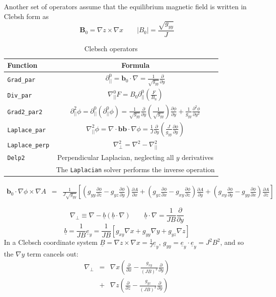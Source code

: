\documentclass[12pt]{article}
\newcommand{\code}[1]{\texttt{#1}}
\newcommand{\deriv}[2]{\ensuremath{\frac{\partial #1}{\partial #2}}}
\begin{document}
Another set of operators assume that the equilibrium magnetic field is written
in Clebsh form as 
\[
\mathbf{B}_0 = \nabla z\times\nabla x \qquad \left|B_0\right| = \frac{\sqrt{g_{yy}}}{J}
\]

\begin{table}[htb!]
\centering
\caption{Clebsch operators}
\label{tab:solvers}
\begin{tabular}{l c}
\hline
Function & Formula \\
\hline
\code{Grad\_par} & $\displaystyle\partial^0_{||} = \mathbf{b}_0\cdot\nabla = \frac{1}{\sqrt{g_{yy}}}\deriv{}{y}$ \\
\code{Div\_par} & $\displaystyle \nabla^0_{||}F = B_0\partial^0_{||}\left(\frac{F}{B_0}\right)$ \\
\code{Grad2\_par2} & $\displaystyle \partial^2_{||}\phi = \partial^0_{||}\left(\partial^0_{||}\phi\right) = \frac{1}{\sqrt{g_{yy}}}\deriv{}{y}\left(\frac{1}{\sqrt{g_{yy}}}\right)\deriv{\phi}{y} + \frac{1}{g_{yy}}\frac{\partial^2\phi}{\partial y^2}$ \\
\code{Laplace\_par} & $\displaystyle \nabla_{||}^2\phi = \nabla\cdot\mathbf{b}\mathbf{b}\cdot\nabla\phi = \frac{1}{J}\deriv{}{y}\left(\frac{J}{g_{yy}}\deriv{\phi}{y}\right)$ \\
\code{Laplace\_perp} & $\displaystyle \nabla_\perp^2 = \nabla^2 - \nabla_{||}^2$ \\
\code{Delp2} & Perpendicular Laplacian, neglecting all $y$ derivatives \\
             & The \code{Laplacian} solver performs the inverse operation \\
\hline
\end{tabular}
\end{table}

\begin{eqnarray*}
\mathbf{b}_0\cdot\nabla\phi\times\nabla A &=& \frac{1}{J\sqrt{g_{yy}}}\left[\left(g_{yy}\deriv{\phi}{z} - g_{yz}\deriv{\phi}{y}\right)\deriv{A}{x} + \left(g_{yz}\deriv{\phi}{x} - g_{xy}\deriv{\phi}{z}\right)\deriv{A}{y} + \left(g_{xy}\deriv{\phi}{y} - g_{yy}\deriv{\phi}{x}\right)\deriv{A}{z}\right]
\end{eqnarray*}

\[
\nabla_\perp \equiv \nabla - \underline{b}\left(\underline{b}\cdot\nabla\right) \qquad \underline{b}\cdot\nabla = \frac{1}{JB}\frac{\partial}{\partial y}
\]
\[
\underline{b} = \frac{1}{JB}\underline{e}_y = \frac{1}{JB}\left[g_{xy}\nabla x + g_{yy}\nabla y + g_{yz}\nabla z\right]
\]
In a Clebsch coordinate system $\underline{B} = \nabla z \times \nabla x = \frac{1}{J}\underline{e}_y$, $g_{yy} = \underline{e}_y\cdot\underline{e}_y = J^2B^2$, and so the $\nabla y$ term cancels out:
\begin{eqnarray*}
\nabla_\perp &=& \nabla x\left(\deriv{}{x} - \frac{g_{xy}}{\left(JB\right)^2}\deriv{}{y}\right) \\
&+& \nabla z\left(\deriv{}{z} - \frac{g_{yz}}{\left(JB\right)^2}\deriv{}{y}\right)
\end{eqnarray*}
\end{document}
